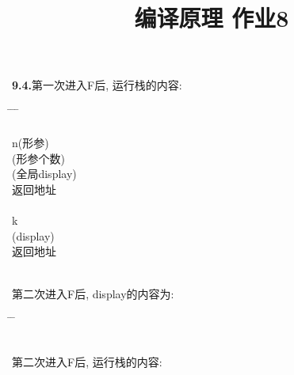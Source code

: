 \documentclass{article}
\title{编译原理 作业8}
\author{}
\date{}
\begin{document}
\textbf{9.4.}第一次进入F后, 运行栈的内容:

\begin{tabbing}
    \hspace{1.5cm} \= \hspace{1.5cm} \= \hspace{1.5cm} \= \kill
     \\

     \\

     \> n(形参)\\

     (形参个数)\\

     (全局display)\\

     \> 返回地址\\

      \\

     \> k\\

     (display)\\

     \> 返回地址\\

     \\
\end{tabbing}

第二次进入F后, display的内容为:

\begin{tabbing}
    \hspace{1.5cm} \= \hspace{1.5cm} \= \kill
     \\

     \\
\end{tabbing}

第二次进入F后, 运行栈的内容:
\end{document}
